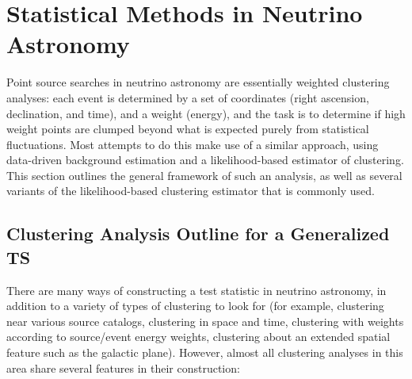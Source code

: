 \chapter{Statistical Methods in Neutrino Astronomy}\label{chapter:methods}
Point source searches in neutrino astronomy are essentially weighted clustering analyses: each event is determined by a set of coordinates (right ascension, declination, and time), and a weight (energy), and the task is to determine if high weight points are clumped beyond what is expected purely from statistical fluctuations. Most attempts to do this make use of a similar approach, using data-driven background estimation and a likelihood-based estimator of clustering. This section outlines the general framework of such an analysis, as well as several variants of the likelihood-based clustering estimator that is commonly used.

\section{Clustering Analysis Outline for a Generalized TS}
There are many ways of constructing a test statistic in neutrino astronomy, in addition to a variety of types of clustering to look for (for example, clustering near various source catalogs, clustering in space and time, clustering with weights according to source/event energy weights, clustering about an extended spatial feature such as the galactic plane). However, almost all clustering analyses in this area share several features in their construction:

